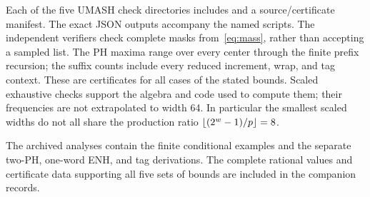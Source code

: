 Each of the five UMASH check directories includes  and a source/certificate manifest. The exact JSON outputs accompany the named scripts. The independent verifiers check complete masks from~\eqref{eq:mass}, rather than accepting a sampled list. The PH maxima range over every center through the finite prefix recursion; the suffix counts include every reduced increment, wrap, and tag context. These are certificates for all cases of the stated bounds. Scaled exhaustive checks support the algebra and code used to compute them; their frequencies are not extrapolated to width 64. In particular the smallest scaled widths do not all share the production ratio $\left\lfloor(2^w-1)/p\right\rfloor=8$.

The archived analyses\cite{gap,jointprior,enhprior} contain the finite conditional examples and the separate two-PH, one-word ENH, and tag derivations. The complete rational values and certificate data supporting all five sets of bounds are included in the companion records\cite{corrected}.




